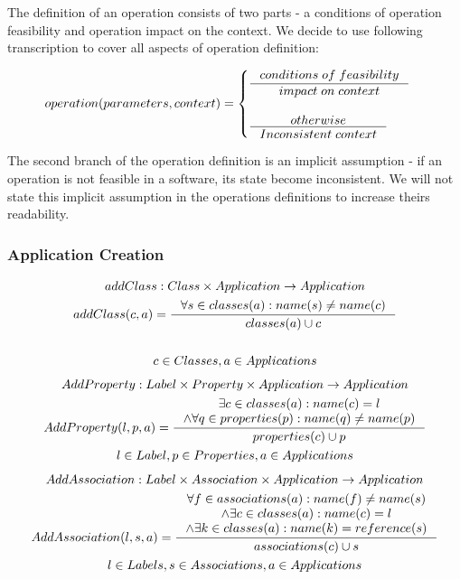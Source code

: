 \documentclass[11pt]{article}
\begin{document}
The definition of an operation consists of two parts - a conditions of operation feasibility and operation impact on the context. We decide to use following transcription to cover all aspects  of operation definition:

\begin{equation*}
\begin{gathered}
operation(parameters, context) = \begin{cases}
  \inference{conditions \; of \; feasibility}{impact \; on \; context}\\ \\
  \inference{otherwise}{Inconsistent \; context}
 \end{cases}
\end{gathered}
\end{equation*}

The second branch of the operation definition is an implicit assumption - if an operation is not feasible in a software, its state become inconsistent. We will not state this implicit assumption in the operations definitions to increase theirs readability.


\subsubsection{Application Creation}
\begin{gather*}
addClass: Class \times Application \rightarrow Application \\ 
addClass(c, a) = \inference{\forall s \in classes(a) : name(s) \neq name(c)}{classes(a) \cup c} \\ \\
c \in Classes, a \in Applications
\end{gather*}
\begin{gather*}
AddProperty : Label \times Property \times Application \rightarrow Application \\
AddProperty(l, p, a) = \inference{\exists c \in classes(a) : name(c) = l \\ \wedge \forall q \in  properties(p) : name(q) \neq name(p)}{properties(c) \cup p } \\
l \in Label, p \in Properties, a \in Applications
\end{gather*}
\begin{gather*}
AddAssociation : Label \times Association \times Application \rightarrow Application \\
AddAssociation(l, s, a) = \inference{\forall f \in associations(a) : name(f) \neq name(s) \\ \wedge \exists c \in classes(a) : name(c) = l \\ \wedge \exists k \in classes(a) : name(k) = reference(s) }{associations(c) \cup s}\\
l \in Labels, s \in Associations, a \in Applications
\end{gather*}
\end{document}
